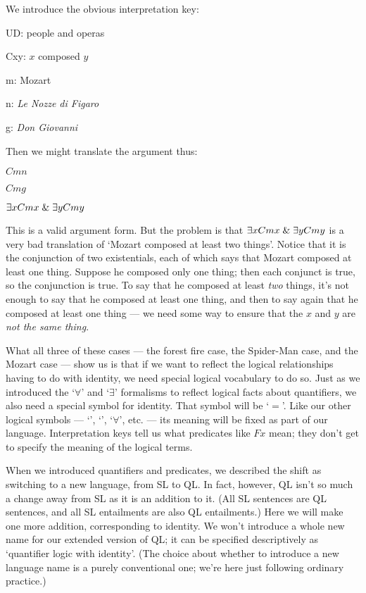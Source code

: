 We introduce the obvious interpretation key:

\begin{ekey}
\item[UD:] people and operas
\item[Cxy:] $x$ composed $y$
\item[m:] Mozart
\item[n:] \emph{Le Nozze di Figaro}
\item[g:] \emph{Don Giovanni}
\end{ekey}

Then we might translate the argument thus:

\begin{earg}
\item[] $Cmn$
\item[] $Cmg$
\item[\therefore] $\exists x Cmx \mathrel\& \exists y Cmy$
\end{earg}

This is a valid argument form. But the problem is that $\exists x Cmx \mathrel\& \exists y Cmy$ is a very bad translation of `Mozart composed at least two things'. Notice that it is the conjunction of two existentials, each of which says that Mozart composed at least one thing. Suppose he composed only one thing; then each conjunct is true, so the conjunction is true. To say that he composed at least \emph{two} things, it's not enough to say that he composed at least one thing, and then to say again that he composed at least one thing --- we need some way to ensure that the $x$ and $y$ are \emph{not the same thing}.

What all three of these cases --- the forest fire case, the Spider-Man case, and the Mozart case --- show us is that if we want to reflect the logical relationships having to do with identity, we need special logical vocabulary to do so. Just as we introduced the `$\forall$' and `$\exists$' formalisms to reflect logical facts about quantifiers, we also need a special symbol for identity. That symbol will be `$=$'. Like our other logical symbols --- `\eif', `\enot', `$\forall$', etc. --- its meaning will be fixed as part of our language. Interpretation keys tell us what predicates like $Fx$ mean; they don't get to specify the meaning of the logical terms.

When we introduced quantifiers and predicates, we described the shift as switching to a new language, from SL to QL. In fact, however, QL isn't so much a change away from SL as it is an addition to it. (All SL sentences are QL sentences, and all SL entailments are also QL entailments.) Here we will make one more addition, corresponding to identity. We won't introduce a whole new name for our extended version of QL; it can be specified descriptively as `quantifier logic with identity'. (The choice about whether to introduce a new language name is a purely conventional one; we're here just following ordinary practice.)

